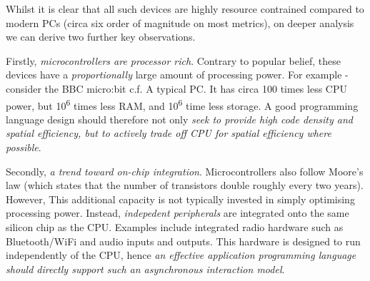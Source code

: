 Whilst it is clear that all such devices are highly resource contrained compared to modern PCs 
(circa six order of magnitude on most metrics), on deeper analysis we can derive two further key observations.

Firstly, \emph{microcontrollers are processor rich}. Contrary to popular belief, these devices have 
a \emph{proportionally} large amount of processing power. For example - consider the BBC micro:bit 
c.f. A typical PC. It has circa 100 times less CPU power, but 10\textsuperscript{6} times less RAM, and 10\textsuperscript{6} time less storage. 
A good programming language design should therefore not only \emph{seek to provide high code density and spatial efficiency, 
but to actively trade off CPU for spatial efficiency where possible}. 

Secondly, \emph{a trend toward on-chip integration}. Microcontrollers also follow Moore's law (which states 
that the number of transistors double roughly every two years). However, This additional capacity is 
not typically invested in simply optimising processing power. Instead, \emph{indepedent peripherals} 
are integrated onto the same silicon chip as the CPU. Examples include integrated radio hardware such 
as Bluetooth/WiFi and audio inputs and outputs. This hardware is designed to run independently of the 
CPU, hence \emph{an effective application programming language should directly support such an asynchronous
interaction model}.

